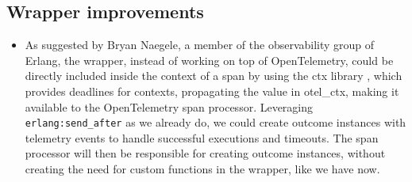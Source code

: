     \subsection{Wrapper improvements}

        \begin{itemize}
            \item As suggested by Bryan Naegele, a member of the observability group of Erlang, the wrapper, instead of working on top of OpenTelemetry, could be directly included inside the context of a span by using the ctx library \cite{ctx}, which provides deadlines for contexts, propagating the value in otel\_ctx, making it available to the OpenTelemetry span processor. Leveraging \texttt{erlang:send\_after} as we already do, we could create outcome instances with telemetry events to handle successful executions and timeouts. The span processor will then be responsible for creating outcome instances, without creating the need for custom functions in the wrapper, like we have now.
        \end{itemize}
